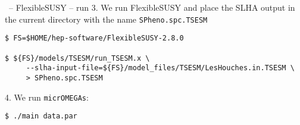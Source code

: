 \documentclass[11pt]{beamer}
\newcommand{\micrOMEGAs}{\texttt{micrOMEGAs}}
\begin{document}

\begin{frame}[fragile]{\insertsection\ -- FlexibleSUSY -- run}
  3. We run FlexibleSUSY and place the SLHA output in the current
  directory with the name \texttt{SPheno.spc.TSESM}
  \begin{lstlisting}
$ FS=$HOME/hep-software/FlexibleSUSY-2.8.0

$ ${FS}/models/TSESM/run_TSESM.x \
     --slha-input-file=${FS}/model_files/TSESM/LesHouches.in.TSESM \
     > SPheno.spc.TSESM\end{lstlisting}%
  4. We run \micrOMEGAs:
  \begin{lstlisting}
$ ./main data.par\end{lstlisting}%
\end{frame}
\end{document}
